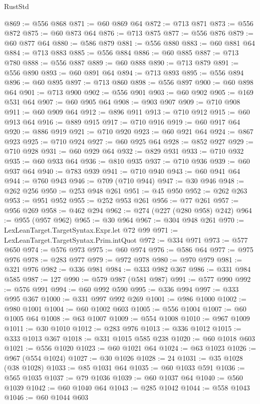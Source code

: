 \begin{lexlean}{RustStd}
\begin{coremodule}
@869 := @556 @868
@871 := @60 @869 @64
@872 := @713 @871
@873 := @556 @872
@875 := @60 @873 @64
@876 := @713 @875
@877 := @556 @876
@879 := @60 @877 @64
@880 := @586 @879
@881 := @556 @880
@883 := @60 @881 @64
@884 := @713 @883
@885 := @556 @884
@886 := @60 @885
@887 := @713 @780
@888 := @556 @887
@889 := @60 @888
@890 := @713 @879
@891 := @556 @890
@893 := @60 @891 @64
@894 := @713 @893
@895 := @556 @894
@896 := @60 @895
@897 := @713 @860
@898 := @556 @897
@900 := @60 @898 @64
@901 := @713 @900
@902 := @556 @901
@903 := @60 @902
@905 := @169 @531 @64
@907 := @60 @905 @64
@908 := @903 @907
@909 := @710 @908
@911 := @60 @909 @64
@912 := @896 @911
@913 := @710 @912
@915 := @60 @913 @64
@916 := @889 @915
@917 := @710 @916
@919 := @60 @917 @64
@920 := @886 @919
@921 := @710 @920
@923 := @60 @921 @64
@924 := @867 @923
@925 := @710 @924
@927 := @60 @925 @64
@928 := @852 @927
@929 := @710 @928
@931 := @60 @929 @64
@932 := @829 @931
@933 := @710 @932
@935 := @60 @933 @64
@936 := @810 @935
@937 := @710 @936
@939 := @60 @937 @64
@940 := @783 @939
@941 := @710 @940
@943 := @60 @941 @64
@944 := @760 @943
@946 := @709 (@710 @944)
@947 := @30 @946
@948 := @262 @256
@950 := @253 @948 @261
@951 := @45 @950
@952 := @262 @263
@953 := @951 @952
@955 := @252 @953 @261
@956 := @77 @261
@957 := @956 @269
@958 := @462 @294
@962 := @274 (@227 (@280 @958) @242)
@964 := @955 (@957 @962)
@965 := @30 @964
@967 := @304 @948 @261
@970 := LexLeanTarget.TargetSyntax.Expr.let @72 @99
@971 := LexLeanTarget.TargetSyntax.Prim.intQuot
@972 := @334 @971
@973 := @577 @650
@974 := @576 @973
@975 := @60 @974
@976 := @586 @64
@977 := @975 @976
@978 := @283 @977
@979 := @972 @978
@980 := @970 @979
@981 := @321 @976
@982 := @336 @981
@984 := @333 @982 @367
@986 := @331 @984 @585
@987 := 127
@990 := @579 @987 (@581 @987)
@991 := @577 @990
@992 := @576 @991
@994 := @60 @992 @590
@995 := @336 @994
@997 := @333 @995 @367
@1000 := @331 @997 @992 @269
@1001 := @986 @1000
@1002 := @980 @1001
@1004 := @60 @1002 @603
@1005 := @556 @1004
@1007 := @60 @1005 @64
@1008 := @63 @1007
@1009 := @554 @1008
@1010 := @967 @1009
@1011 := @30 @1010
@1012 := @283 @976
@1013 := @336 @1012
@1015 := @333 @1013 @367
@1018 := @331 @1015 @585 @238
@1020 := @60 @1018 @603
@1021 := @556 @1020
@1023 := @60 @1021 @64
@1024 := @63 @1023
@1026 := @967 (@554 @1024)
@1027 := @30 @1026
@1028 := 24
@1031 := @35 @1028 (@38 @1028)
@1033 := @85 @1031 @64
@1035 := @60 @1033 @591
@1036 := @565 @1035
@1037 := @79 @1036
@1039 := @60 @1037 @64
@1040 := @560 @1039
@1042 := @60 @1040 @64
@1043 := @285 @1042
@1044 := @558 @1043
@1046 := @60 @1044 @603

\end{coremodule}
\end{lexlean}
